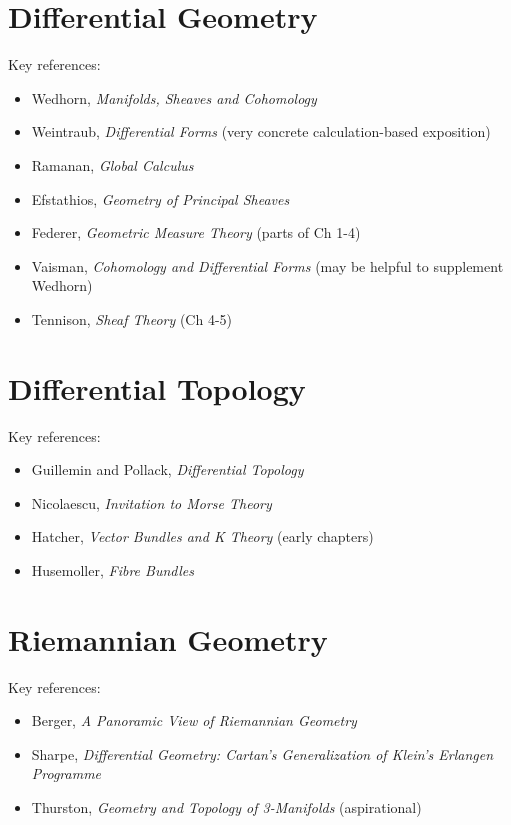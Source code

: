 \documentclass[article]{article}
\begin{document}
\section{Differential Geometry}

Key references:
\begin{itemize}
	\item{Wedhorn, \textit{Manifolds, Sheaves and Cohomology}}
	\item{Weintraub, \textit{Differential Forms} (very concrete calculation-based exposition)}
	\item{Ramanan, \textit{Global Calculus}}
	\item{Efstathios, \textit{Geometry of Principal Sheaves}}
	\item{Federer, \textit{Geometric Measure Theory} (parts of Ch 1-4)}
	\item{Vaisman, \textit{Cohomology and Differential Forms} (may be helpful to supplement Wedhorn)}
	\item{Tennison, \textit{Sheaf Theory} (Ch 4-5)}
\end{itemize}

\section{Differential Topology}

Key references:
\begin{itemize}
	\item{Guillemin and Pollack, \textit{Differential Topology}}
	\item{Nicolaescu, \textit{Invitation to Morse Theory}}
	\item{Hatcher, \textit{Vector Bundles and K Theory} (early chapters)}
	\item{Husemoller, \textit{Fibre Bundles}}
\end{itemize}

\section{Riemannian Geometry}

Key references:
\begin{itemize}
	\item{Berger, \textit{A Panoramic View of Riemannian Geometry}}
	\item{Sharpe, \textit{Differential Geometry: Cartan’s Generalization of Klein’s Erlangen Programme}}
	\item{Thurston, \textit{Geometry and Topology of 3-Manifolds} (aspirational)}
\end{itemize}
\end{document}
